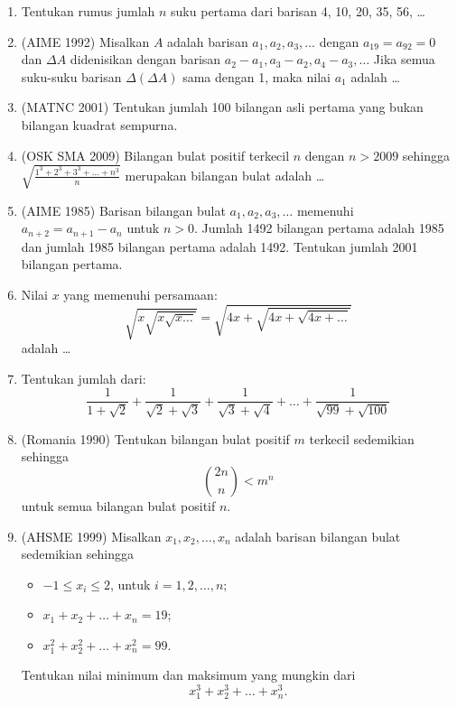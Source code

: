 \documentclass[12pt]{scrartcl}
\begin{document}
\begin{enumerate}
    \item Tentukan rumus jumlah $n$ suku pertama dari barisan 4, 10, 20, 35, 56, \dots
    
    \item (AIME 1992) Misalkan $A$ adalah barisan $a_1, a_2, a_3, \dots$ dengan $a_{19}=a_{92}=0$ dan $\Delta A$ didenisikan dengan barisan $a_2-a_1, a_3-a_2, a_4-a_3, \dots$ Jika semua suku-suku barisan $\Delta(\Delta A)$ sama dengan 1, maka nilai $a_1$ adalah \dots
    
    \item (MATNC 2001) Tentukan jumlah 100 bilangan asli pertama yang bukan bilangan kuadrat sempurna.
    
    \item (OSK SMA 2009) Bilangan bulat positif terkecil $n$ dengan $n>2009$ sehingga $\sqrt{\frac{1^3+2^3+3^3+\dots+n^3}{n}}$ merupakan bilangan bulat adalah \dots
    
    \item (AIME 1985) Barisan bilangan bulat $a_1, a_2, a_3, \dots$ memenuhi $a_{n+2} = a_{n+1} - a_n$ untuk $n > 0$. Jumlah 1492 bilangan pertama adalah 1985 dan jumlah 1985 bilangan pertama adalah 1492. Tentukan jumlah 2001 bilangan pertama.
    
    \item Nilai $x$ yang memenuhi persamaan:
    \[ \sqrt{x\sqrt{x\sqrt{x\dots}}} = \sqrt{4x+\sqrt{4x+\sqrt{4x+\dots}}} \]
    adalah \dots
    
    \item Tentukan jumlah dari:
    \[ \frac{1}{1+\sqrt{2}} + \frac{1}{\sqrt{2}+\sqrt{3}} + \frac{1}{\sqrt{3}+\sqrt{4}} + \dots + \frac{1}{\sqrt{99}+\sqrt{100}} \]

    \item (Romania 1990) Tentukan bilangan bulat positif $m$ terkecil sedemikian sehingga
    \[ \binom{2n}{n} < m^n \]
    untuk semua bilangan bulat positif $n$.

    \item (AHSME 1999) Misalkan $x_1, x_2, \dots, x_n$ adalah barisan bilangan bulat sedemikian sehingga
    \begin{itemize}
        \item[(i)] $-1 \le x_i \le 2$, untuk $i = 1, 2, \dots, n$;
        \item[(ii)] $x_1 + x_2 + \dots + x_n = 19$;
        \item[(iii)] $x_1^2 + x_2^2 + \dots + x_n^2 = 99$.
    \end{itemize}
    Tentukan nilai minimum dan maksimum yang mungkin dari
    \[ x_1^3 + x_2^3 + \dots + x_n^3. \]


\end{enumerate}
\end{document}

